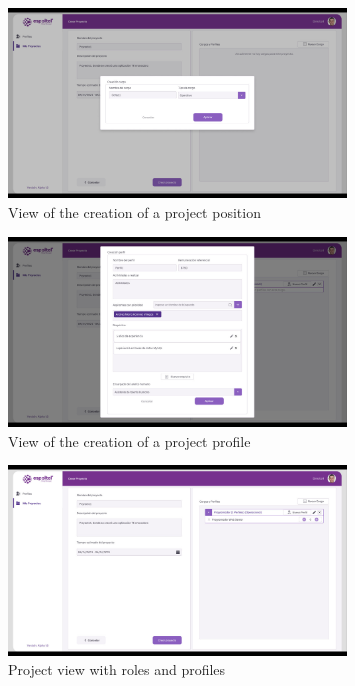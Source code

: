 \documentclass{scrreprt}
\begin{document}
\begin{figure}[H]
	\centering \small
	\includegraphics[width=0.8\textwidth]{WebPrototype/wflow-10.jpeg}
	\caption{View of the creation of a project position}
\end{figure}

\begin{figure}[H]
	\centering \small
	\includegraphics[width=0.8\textwidth]{WebPrototype/wflow-11.jpeg}
	\caption{View of the creation of a project profile}
\end{figure}


\begin{figure}[H]
	\centering \small
	\includegraphics[width=0.8\textwidth]{WebPrototype/wflow-12.jpeg}
	\caption{Project view with roles and profiles}
\end{figure}
\end{document}
